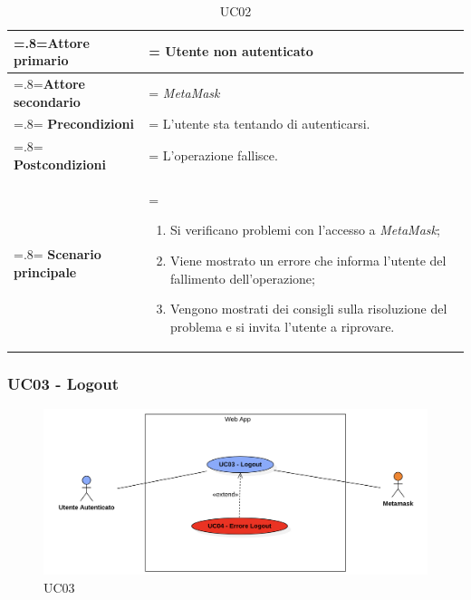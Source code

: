                 \begin{table}[H]
                    \centering
                    \renewcommand{\arraystretch}{1.8}
                    \renewcommand\tabularxcolumn[1]{m{#1}}
                    \begin{tabularx}{0.9\textwidth} {
                        >{\hsize=.8\hsize\linewidth=\hsize}X
                        >{\hsize=1.2\hsize\linewidth=\hsize}X}
                        \hline
                        \textbf{Attore primario} & Utente non autenticato \\
                        \hline
                        \textbf{Attore secondario} & \textit{MetaMask} \\
                        \hline
                        \textbf{Precondizioni} & L'utente sta tentando di autenticarsi. \\
                        \hline
                        \textbf{Postcondizioni} & L'operazione fallisce. \\
                        \hline
                        \textbf{Scenario principale} &
                            \begin{enumerate}
                                \item Si verificano problemi con l'accesso a \textit{MetaMask};
                                \item Viene mostrato un errore che informa l'utente del fallimento dell'operazione;
                                \item Vengono mostrati dei consigli sulla risoluzione del problema e si invita
                                l'utente a riprovare.
                            \end{enumerate} \\
                        \hline
                    \end{tabularx}
                    \caption{UC02}
                \end{table}

        \subsubsection{UC03 - Logout}
        \label{UC03}

            \begin{figure}[H]
                \centering
                \includegraphics[scale=0.6]{src/img/UC03.png}
                \caption{UC03}
            \end{figure}

